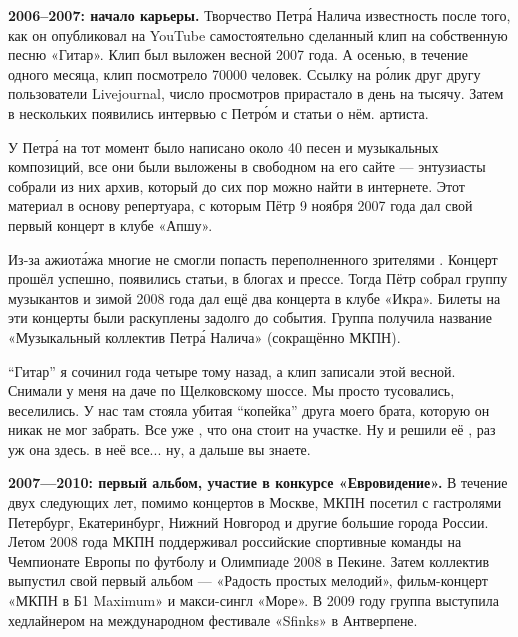 \textbf{2006--2007: начало карьеры.}
Творчество Петр\'{а} Налича 
известность после того, как он опубликовал на YouTube самостоятельно сделанный клип
на собственную песню «Гитар».
Клип был выложен весной 2007 года. А осенью, в течение одного месяца, клип посмотрело 70000 человек.
Ссылку на р\'{о}лик 
друг другу пользователи Livejournal, число просмотров прирастало в день на тысячу. Затем в нескольких   появились интервью с Петр\'{о}м и статьи о нём.    артиста.

У Петр\'{а} на тот момент было написано около 40 песен и музыкальных композиций, все они были выложены в свободном  на его сайте --- энтузиасты собрали из них архив, который до сих пор можно найти в интернете. Этот материал  в основу репертуара, с которым Пётр 9 ноября 2007 года дал свой первый концерт в клубе «Апшу».

Из-за ажиот\'{а}жа многие не смогли попасть  переполненного зрителями . Концерт прошёл успешно, появились статьи,  в блогах и прессе. Тогда Пётр собрал группу музыкантов и зимой 2008 года дал ещё два концерта в клубе «Икра». Билеты на эти концерты были раскуплены задолго до события. Группа получила название «Музыкальный коллектив Петр\'{а} Налича» (сокращённо МКПН).

\begin{fancyquotes}
    ``Гитар'' я сочинил года четыре тому назад, а клип записали этой весной. Снимали у меня на даче по Щелковскому шоссе. Мы просто тусовались, веселились. У нас там стояла убитая ``копейка'' друга моего брата, которую он никак не мог забрать. Все уже , что она стоит на участке. Ну и решили её , раз уж она здесь.  в неё все... ну, а дальше вы знаете.
\end{fancyquotes}

\textbf{2007---2010: первый альбом, участие в конкурсе «Евровидение».}
В течение двух следующих лет, помимо концертов в Москве, МКПН посетил с гастролями Петербург, Екатеринбург, Нижний Новгород и другие большие города России. Летом 2008 года МКПН поддерживал российские спортивные команды на Чемпионате Европы по футболу и Олимпиаде 2008 в Пекине. Затем коллектив выпустил свой первый альбом --- «Радость простых мелодий», фильм-концерт «МКПН в Б1 Maximum» и макси-сингл «Море». В 2009 году группа выступила хедлайнером на международном фестивале «Sfinks» в Антверпене.

